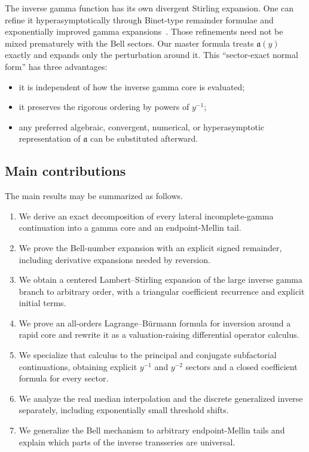 \documentclass[11pt,a4paper]{article}
\numberwithin{equation}{section}
\theoremstyle{definition}
\theoremstyle{remark}
\newcommand{\InvCore}{\mathfrak a}
\begin{document}
The inverse gamma function has its own divergent Stirling expansion.  One
can refine it hyperasymptotically through Binet-type remainder formulae and
exponentially improved gamma expansions~\cite{DLMFGamma,Olver1997}.  Those
refinements need not be mixed prematurely with the Bell sectors.  Our master
formula treats $\InvCore(y)$ exactly and expands only the perturbation around
it.  This ``sector-exact normal form'' has three advantages:

\begin{itemize}
\item it is independent of how the inverse gamma core is evaluated;
\item it preserves the rigorous ordering by powers of $y^{-1}$;
\item any preferred algebraic, convergent, numerical, or hyperasymptotic
      representation of $\InvCore$ can be substituted afterward.
\end{itemize}

\subsection{Main contributions}

The main results may be summarized as follows.

\begin{enumerate}
\item We derive an exact decomposition of every lateral incomplete-gamma
      continuation into a gamma core and an endpoint-Mellin tail.
\item We prove the Bell-number expansion with an explicit signed remainder,
      including derivative expansions needed by reversion.
\item We obtain a centered Lambert--Stirling expansion of the large inverse
      gamma branch to arbitrary order, with a triangular coefficient
      recurrence and explicit initial terms.
\item We prove an all-orders Lagrange--B\"urmann formula for inversion around
      a rapid core and rewrite it as a valuation-raising differential
      operator calculus.
\item We specialize that calculus to the principal and conjugate
      subfactorial continuations, obtaining explicit $y^{-1}$ and $y^{-2}$
      sectors and a closed coefficient formula for every sector.
\item We analyze the real median interpolation and the discrete generalized
      inverse separately, including exponentially small threshold shifts.
\item We generalize the Bell mechanism to arbitrary endpoint-Mellin tails
      and explain which parts of the inverse transseries are universal.
\end{enumerate}
\end{document}
